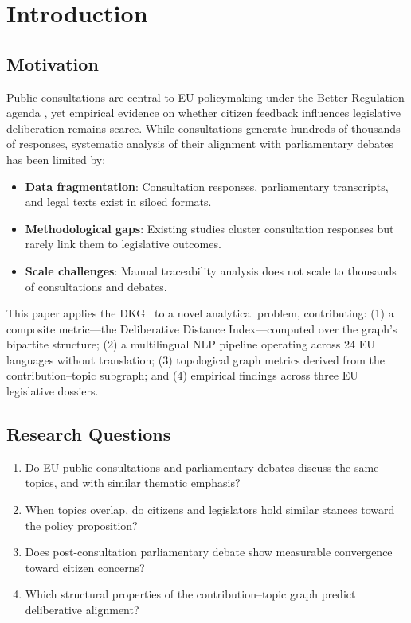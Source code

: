 \documentclass[sigconf,natbib]{acmart}
\begin{document}

\maketitle

\section{Introduction}

\subsection{Motivation}
Public consultations are central to EU policymaking under the Better Regulation agenda \citep{EC2015}, yet empirical evidence on whether citizen feedback influences legislative deliberation remains scarce. While consultations generate hundreds of thousands of responses, systematic analysis of their alignment with parliamentary debates has been limited by:
\begin{itemize}
  \item \textbf{Data fragmentation}: Consultation responses, parliamentary transcripts, and legal texts exist in siloed formats.
  \item \textbf{Methodological gaps}: Existing studies cluster consultation responses \citep{DiPorto2024} but rarely link them to legislative outcomes.
  \item \textbf{Scale challenges}: Manual traceability analysis does not scale to thousands of consultations and debates.
\end{itemize}

This paper applies the DKG~\cite{Vagnoni2026} to a novel analytical problem, contributing:
(1) a composite metric---the Deliberative Distance Index---computed over the graph's bipartite structure;
(2) a multilingual NLP pipeline operating across 24 EU languages without translation;
(3) topological graph metrics derived from the contribution--topic subgraph; and
(4) empirical findings across three EU legislative dossiers.

\subsection{Research Questions}
\begin{enumerate}
  \item[\textbf{RQ1}] Do EU public consultations and parliamentary debates discuss the same topics, and with similar thematic emphasis?
  \item[\textbf{RQ2}] When topics overlap, do citizens and legislators hold similar stances toward the policy proposition?
  \item[\textbf{RQ3}] Does post-consultation parliamentary debate show measurable convergence toward citizen concerns?
  \item[\textbf{RQ4}] Which structural properties of the contribution--topic graph predict deliberative alignment?
\end{enumerate}
\end{document}
